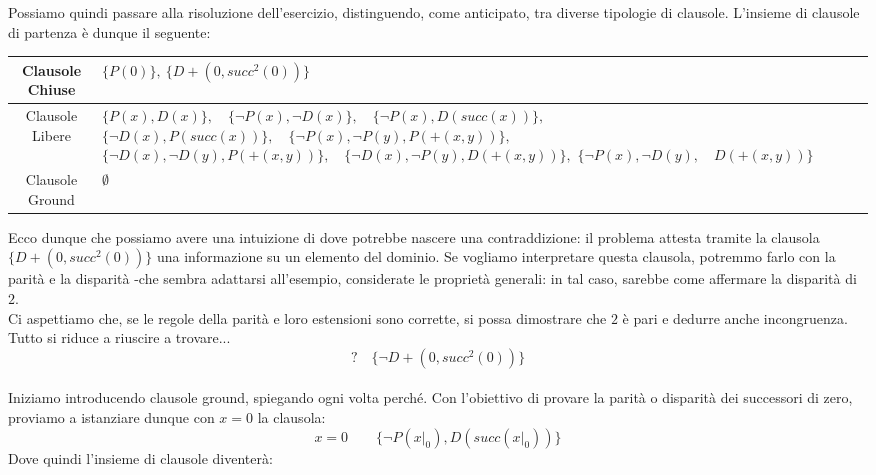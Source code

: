 \documentclass[a4paper,10pt]{article}
\begin{document}
Possiamo quindi passare alla risoluzione dell'esercizio, distinguendo, come anticipato, tra diverse tipologie di clausole. L'insieme di clausole di partenza è dunque il seguente:


\begin{table}[h]
    \centering
    \small 
    \renewcommand{\arraystretch}{1.5} 
    
    \begin{tabularx}{\textwidth}{|c|>{\centering\arraybackslash}X|}
        \hline
        Clausole Chiuse & $\{P(0)\}, \ \{D+(0,succ^2(0))\}$ \\
        \hline
        Clausole Libere & 
            $\{P(x), D(x)\},\quad \{\lnot P(x), \lnot D(x)\},\quad \{\lnot P(x), D(succ(x))\},$\newline
            $\{\lnot D(x), P(succ(x))\},\quad \{\lnot P(x), \lnot P(y), P(+(x, y))\},$\newline
            $\{\lnot D(x), \lnot D(y), P(+(x, y))\},\quad \{\lnot D(x), \lnot P(y), D(+(x, y))\},$\newline
            $\{\lnot P(x), \lnot D(y),\quad D(+(x, y))\}$ 
            \\
        \hline
        Clausole Ground & $\emptyset$ \\
        \hline
    \end{tabularx}
\end{table}

Ecco dunque che possiamo avere una intuizione di dove potrebbe nascere una contraddizione: il problema attesta tramite la clausola $\{D+(0,succ^2(0))\}$ una informazione su un elemento del dominio. Se vogliamo interpretare questa clausola, potremmo farlo con la parità e la disparità -che sembra adattarsi all'esempio, considerate le proprietà generali: in tal caso, sarebbe come affermare la disparità di $2$. \\ Ci aspettiamo che, se le regole della parità e loro estensioni sono corrette, si possa dimostrare che $2$ è pari e dedurre anche incongruenza. Tutto si riduce a riuscire a trovare... 
$$?\quad \{\lnot D+(0,succ^2(0))\}$$\\
Iniziamo introducendo clausole ground, spiegando ogni volta perché. 
Con l'obiettivo di provare la parità o disparità dei successori di zero, proviamo a istanziare dunque con $x=0$ la clausola:
$$x=0\quad \quad \{\lnot P(x|_0), D(succ(x|_0))\}$$
Dove quindi l'insieme di clausole diventerà:
\end{document}
